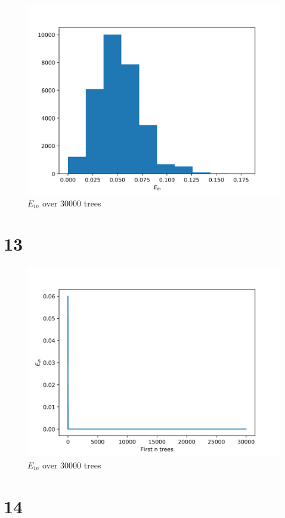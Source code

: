 \documentclass[fleqn,a4paper,12pt]{article}
\begin{document}
\begin{figure}[H]
\centering
\includegraphics[width=0.75\linewidth]{hist-ein.png}
\caption{$E_{in}$ over 30000 trees}
\label{fig:hist-ein}
\end{figure}

\section*{13}

\begin{figure}[H]
\centering
\includegraphics[width=0.75\linewidth]{tree-ein.png}
\caption{$E_{in}$ over 30000 trees}
\label{fig:tree-ein}
\end{figure}

\section*{14}
\end{document}
